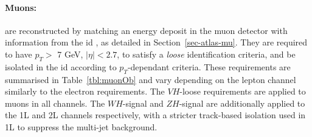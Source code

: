 \begin{table}[!htbp]
  \begin{center}
    \caption{Electron Selection requirements.} 
    \label{tbl:elOb}
  \end{center}
\end{table}

\paragraph{Muons:} are reconstructed by matching an energy deposit in the muon detector  with information from the \gls{id} \cite{Aad:2746302}, as detailed in Section~\ref{sec-atlas-mu}. They are required to have $p_T >$ 7 GeV, $|\eta| < 2.7$, to satisfy a \textit{loose} identification criteria, and be isolated in the \gls{id} according to $p_T$-dependant criteria. These requirements are summarised in Table~\ref{tbl:muonOb} and vary depending on the lepton channel similarly to the electron requirements. The $VH$-loose requirements are applied to muons in all channels. The $WH$-signal and $ZH$-signal are additionally applied to the 1L and 2L channels respectively, with a stricter track-based isolation used in 1L to suppress the multi-jet background.

